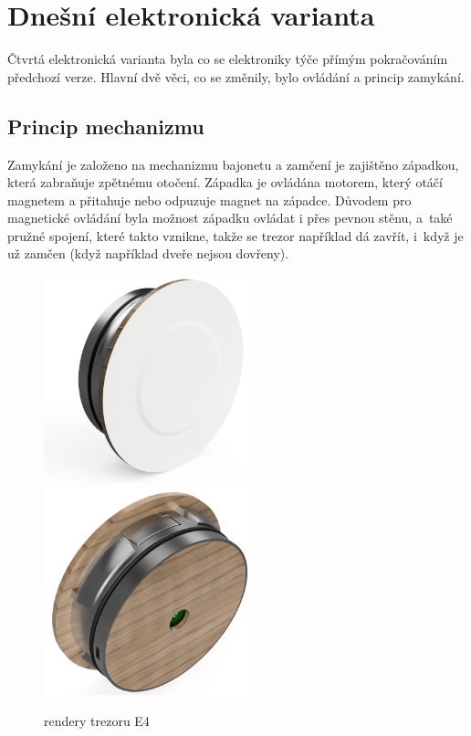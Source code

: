 \section{Dnešní elektronická varianta}

Čtvrtá elektronická varianta byla co se elektroniky týče přímým pokračováním předchozí verze. 
Hlavní dvě věci, co se změnily, bylo ovládání a princip zamykání. 

\subsection*{Princip mechanizmu}

Zamykání je založeno na mechanizmu bajonetu a zamčení je zajištěno západ\-kou, která zabraňuje zpětnému otočení.
Západka je ovládána motorem, který otáčí magnetem a přitahuje nebo odpuzuje magnet na západce. Důvodem pro magnetické ovládání
byla možnost západku ovládat i přes pevnou stěnu, a~také pružné spojení, které takto vznikne, takže se trezor například dá zavřít, i~když
je už zamčen (když například dveře nejsou dovřeny).

\begin{figure}[htbp]
    \centering
    \includegraphics[width=170pt]{kapitoly/obrazky/E4/predni_render.png}
    \includegraphics[width=170pt]{kapitoly/obrazky/E4/zadni_render.png}
    \caption{rendery trezoru E4}
    \label{fig:E4-render}
\end{figure}

